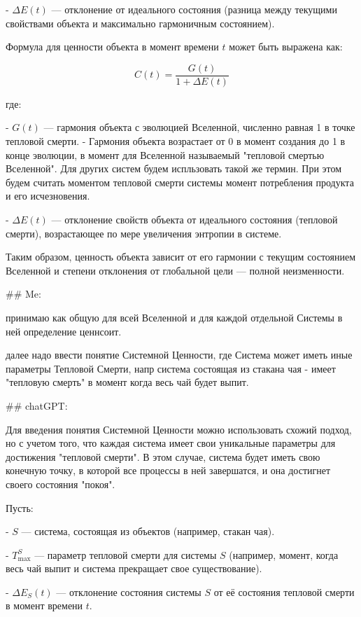 - \( \Delta E(t) \) — отклонение от идеального состояния (разница между текущими свойствами объекта и максимально гармоничным состоянием).


Формула для ценности объекта в момент времени \( t \) может быть выражена как:


\[

C(t) = \frac{G(t)}{1 + \Delta E(t)}

\]


где:


- \( G(t) \) — гармония объекта с эволюцией Вселенной, численно равная 1 в точке тепловой смерти. - Гармония объекта возрастает от 0 в момент создания  до 1 в конце эволюции, в момент для Вселенной называемый "тепловой смертью Вселенной". Для других систем  будем испльзовать такой же термин. При этом будем считать моментом тепловой смерти системы момент потребления продукта и его исчезновения.

- \( \Delta E(t) \) — отклонение свойств объекта от идеального состояния (тепловой смерти), возрастающее по мере увеличения энтропии в системе.


Таким образом, ценность объекта зависит от его гармонии с текущим состоянием Вселенной и степени отклонения от глобальной цели — полной неизменности.


## Me:

принимаю как общую для всей Вселенной и для каждой отдельной Системы в ней определение ценнсоит. 

далее надо ввести понятие Системной Ценности, где Система может иметь иные параметры Тепловой Смерти, напр система состоящая из стакана чая - имеет "тепловую смерть" в момент  когда весь чай будет выпит.


## chatGPT:

Для введения понятия Системной Ценности можно использовать схожий подход, но с учетом того, что каждая система имеет свои уникальные параметры для достижения "тепловой смерти". В этом случае, система будет иметь свою конечную точку, в которой все процессы в ней завершатся, и она достигнет своего состояния "покоя".


Пусть:


- \( S \) — система, состоящая из объектов (например, стакан чая).

- \( T_{\text{max}}^S \) — параметр тепловой смерти для системы \( S \) (например, момент, когда весь чай выпит и система прекращает свое существование).

- \( \Delta E_S(t) \) — отклонение состояния системы \( S \) от её состояния тепловой смерти в момент времени \( t \).

